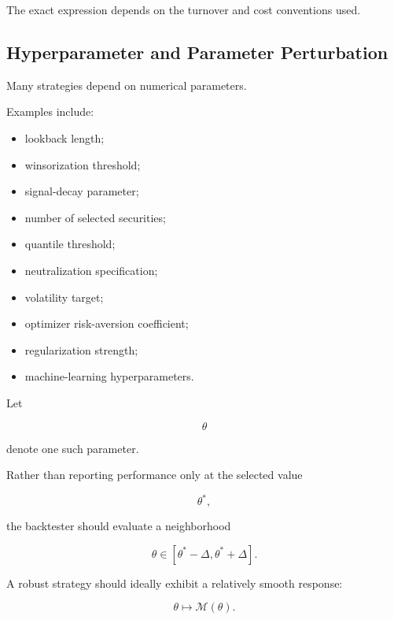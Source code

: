 \documentclass[11pt,a4paper]{article}
\begin{document}
The exact expression depends on the turnover and cost conventions used.


\subsection{Hyperparameter and Parameter Perturbation}
\label{subsec:parameter_perturbation}

Many strategies depend on numerical parameters.

Examples include:

\begin{itemize}
    \item lookback length;
    \item winsorization threshold;
    \item signal-decay parameter;
    \item number of selected securities;
    \item quantile threshold;
    \item neutralization specification;
    \item volatility target;
    \item optimizer risk-aversion coefficient;
    \item regularization strength;
    \item machine-learning hyperparameters.
\end{itemize}

Let

\begin{equation}
\theta
\end{equation}

denote one such parameter.

Rather than reporting performance only at the selected value

\begin{equation}
\theta^*,
\end{equation}

the backtester should evaluate a neighborhood

\begin{equation}
\boxed{
\theta
\in
[
\theta^*-\Delta,
\theta^*+\Delta
].
}
\end{equation}

A robust strategy should ideally exhibit a relatively smooth response:

\begin{equation}
\boxed{
\theta
\longmapsto
\mathcal{M}(\theta).
}
\end{equation}
\end{document}
